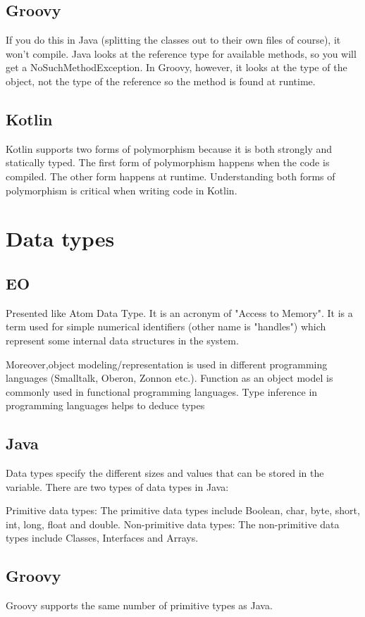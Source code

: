 \documentclass[12pt]{book}
\begin{document}
\subsection{Groovy}
If you do this in Java (splitting the classes out to their own files of course), it won't compile. Java looks at the reference type for available methods, so you will get a NoSuchMethodException. In Groovy, however, it looks at the type of the object, not the type of the reference so the method is found at runtime.

\subsection{Kotlin}
Kotlin supports two forms of polymorphism because it is both strongly and statically typed. The first form of polymorphism happens when the code is compiled. The other form happens at runtime. Understanding both forms of polymorphism is critical when writing code in Kotlin.

\section{Data types}

\subsection{EO}
Presented like Atom Data Type. It is an acronym of "Access to Memory". It is a term used for simple numerical identifiers (other name is "handles") which represent some internal data structures in the system.

Moreover,object modeling/representation is used in different programming languages (Smalltalk, Oberon, Zonnon etc.). Function as an object model is commonly used in functional programming languages. Type inference in programming languages helps to deduce types

\subsection{Java}
Data types specify the different sizes and values that can be stored in the variable. 
There are two types of data types in Java:

Primitive data types: The primitive data types include Boolean, char, byte, short, 
int, long, float and double.
Non-primitive data types:
 The non-primitive data types include Classes, Interfaces and Arrays.

\subsection{Groovy}
Groovy supports the same number of primitive types as Java.
\end{document}
